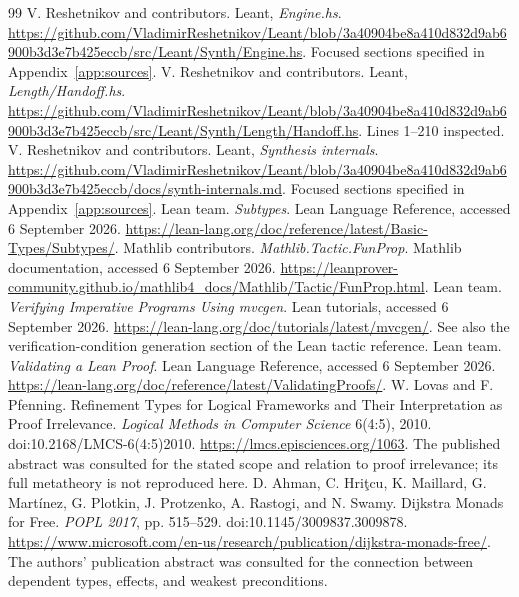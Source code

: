 \documentclass[11pt,a4paper]{article}
\theoremstyle{plain}\newtheorem{proposition}{Proposition}[section]
\theoremstyle{definition}\newtheorem{definition}[proposition]{Definition}
\theoremstyle{remark}\newtheorem{remark}[proposition]{Remark}
\begin{document}
\begin{thebibliography}{99}
 V. Reshetnikov and contributors. Leant, \emph{Engine.hs}. \url{https://github.com/VladimirReshetnikov/Leant/blob/3a40904be8a410d832d9ab6900b3d3e7b425eccb/src/Leant/Synth/Engine.hs}. Focused sections specified in Appendix~\ref{app:sources}.
 V. Reshetnikov and contributors. Leant, \emph{Length/Handoff.hs}. \url{https://github.com/VladimirReshetnikov/Leant/blob/3a40904be8a410d832d9ab6900b3d3e7b425eccb/src/Leant/Synth/Length/Handoff.hs}. Lines 1--210 inspected.
 V. Reshetnikov and contributors. Leant, \emph{Synthesis internals}. \url{https://github.com/VladimirReshetnikov/Leant/blob/3a40904be8a410d832d9ab6900b3d3e7b425eccb/docs/synth-internals.md}. Focused sections specified in Appendix~\ref{app:sources}.
 Lean team. \emph{Subtypes}. Lean Language Reference, accessed 6 September 2026. \url{https://lean-lang.org/doc/reference/latest/Basic-Types/Subtypes/}.
 Mathlib contributors. \emph{Mathlib.Tactic.FunProp}. Mathlib documentation, accessed 6 September 2026. \url{https://leanprover-community.github.io/mathlib4_docs/Mathlib/Tactic/FunProp.html}.
 Lean team. \emph{Verifying Imperative Programs Using mvcgen}. Lean tutorials, accessed 6 September 2026. \url{https://lean-lang.org/doc/tutorials/latest/mvcgen/}. See also the verification-condition generation section of the Lean tactic reference.
 Lean team. \emph{Validating a Lean Proof}. Lean Language Reference, accessed 6 September 2026. \url{https://lean-lang.org/doc/reference/latest/ValidatingProofs/}.
 W. Lovas and F. Pfenning. Refinement Types for Logical Frameworks and Their Interpretation as Proof Irrelevance. \emph{Logical Methods in Computer Science} 6(4:5), 2010. doi:10.2168/LMCS-6(4:5)2010. \url{https://lmcs.episciences.org/1063}. The published abstract was consulted for the stated scope and relation to proof irrelevance; its full metatheory is not reproduced here.
 D. Ahman, C. Hri\c tcu, K. Maillard, G. Mart\'inez, G. Plotkin, J. Protzenko, A. Rastogi, and N. Swamy. Dijkstra Monads for Free. \emph{POPL 2017}, pp. 515--529. doi:10.1145/3009837.3009878. \url{https://www.microsoft.com/en-us/research/publication/dijkstra-monads-free/}. The authors' publication abstract was consulted for the connection between dependent types, effects, and weakest preconditions.
\end{thebibliography}
\end{document}
